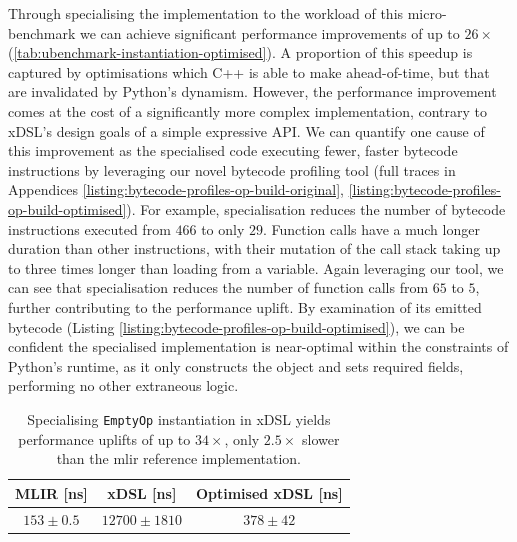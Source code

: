 Through specialising the implementation to the workload of this micro-benchmark we can achieve significant performance improvements of up to $26\times$ (\autoref{tab:ubenchmark-instantiation-optimised}). A proportion of this speedup is captured by optimisations which C++ is able to make ahead-of-time, but that are invalidated by Python's dynamism. %
However, the performance improvement comes at the cost of a significantly more complex implementation, contrary to xDSL's design goals of a simple expressive API.
We can quantify one cause of this improvement as the specialised code executing fewer, faster bytecode instructions by leveraging our novel bytecode profiling tool (full traces in Appendices \ref{listing:bytecode-profiles-op-build-original}, \ref{listing:bytecode-profiles-op-build-optimised}).
For example, specialisation reduces the number of bytecode instructions executed from $466$ to only $29$. Function calls have a much longer duration than other instructions, with their mutation of the call stack taking up to three times longer than loading from a variable. Again leveraging our tool, we can see that specialisation reduces the number of function calls from $65$ to $5$, further contributing to the performance uplift.
By examination of its emitted bytecode (Listing \ref{listing:bytecode-profiles-op-build-optimised}), we can be confident the specialised implementation is near-optimal within the constraints of Python's runtime, as it only constructs the object and sets required fields, performing no other extraneous logic.

\begin{table}[H]
  \caption{Specialising \texttt{EmptyOp} instantiation in xDSL yields performance uplifts of up to $34\times$, only $2.5\times$ slower than the \ac{mlir} reference implementation.}
  \label{tab:ubenchmark-instantiation-optimised}
  \centering
  \begin{tabular}{ccc}
    \toprule
    \textbf{MLIR [ns]} & \textbf{xDSL [ns]} & \textbf{Optimised xDSL [ns]} \\
    \midrule
    $153 \pm 0.5$ & $12700 \pm 1810$ & $378 \pm 42$ \\
    \bottomrule
  \end{tabular}
\end{table}




